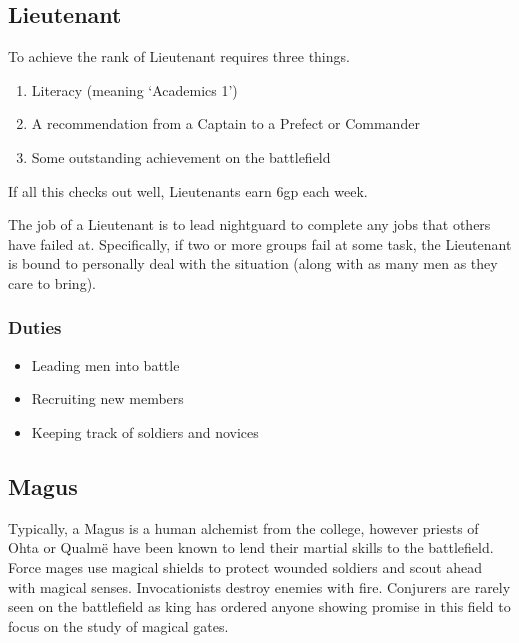 \begin{multicols}{2}
\subsection{Lieutenant}

To achieve the rank of Lieutenant requires three things.

\begin{enumerate}

	\item{Literacy (meaning `Academics 1')}
	\item{A recommendation from a Captain to a Prefect or Commander}
	\item{Some outstanding achievement on the battlefield}

\end{enumerate}

\noindent
If all this checks out well, Lieutenants earn 6gp each week.

The job of a Lieutenant is to lead \gls{nightguard} to complete any jobs that others have failed at.
Specifically, if two or more groups fail at some task, the Lieutenant is bound to personally deal with the situation (along with as many men as they care to bring).

\subsubsection{Duties}

\begin{itemize}

	\item{Leading men into battle}
	\item{Recruiting new members}
	\item{Keeping track of soldiers and novices}

\end{itemize}

\subsection{Magus}

Typically, a Magus is a human alchemist from the \gls{college}, however priests of Ohta or Qualm\"e have been known to lend their martial skills to the battlefield.
Force mages use magical shields to protect wounded soldiers and scout ahead with magical senses.
Invocationists destroy enemies with fire.
Conjurers are rarely seen on the battlefield as \gls{king} has ordered anyone showing promise in this field to focus on the study of magical gates.


\end{multicols}
